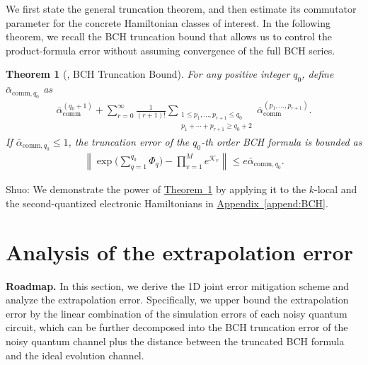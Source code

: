\documentclass[aps,pra,reprint,groupedaddress,floatfix]{revtex4-2}
\newtheorem{theorem}{Theorem}
\newcommand{\thm}[1]{\hyperref[thm:#1]{Theorem~\ref*{thm:#1}}}
\newcommand{\append}[1]{\hyperref[append:#1]{Appendix~\ref*{append:#1}}}
\renewcommand{\comm}{\mathrm{comm}}
\newcommand{\mc}{\mathcal}
\newcommand{\sz}[1]{{\color{blue} Shuo: #1}}
\begin{document}
We first state the general truncation theorem, and then estimate its commutator parameter for the concrete Hamiltonian classes of interest.
In the following theorem, we recall the BCH truncation bound that allows us to control the product-formula error without assuming convergence of the full BCH series.
\begin{theorem}[{\cite[Theorem~6]{wang2026lindbladiansimulationcommutatorbounds}}, BCH Truncation Bound]
 \label{thm:general-bch-truncation}
 For any positive integer $q_0$, define $\bar{\alpha}_{\comm,q_0}$ as
 \begin{align}
\label{eq:def-beta-comm-sum}
    \bar{\alpha}_{\comm}^{(q_0+1)}
    +
    \sum_{r = 0}^{\infty}\frac{1}{(r+1)!}
    \sum_{\substack{1\le p_1, \ldots, p_{r+1}\le q_0\\p_1+\cdots+p_{r+1} \ge q_0+2}}
    \bar{\alpha}_{\comm}^{(p_1, \ldots, p_{r+1})}.
\end{align}
 If $\bar{\alpha}_{\comm,q_0} \le 1$, the truncation error of the $q_0$-th order BCH formula is bounded as
 \begin{align*}
 \left\|\exp\Big(\sum_{q=1}^{q_0} \Phi_q\Big) - \prod_{v = 1}^Me^{\mc K_v} \right\| \le e\bar{\alpha}_{\comm,q_0}.
 \end{align*}
\end{theorem}

\sz{We demonstrate the power of \thm{general-bch-truncation} by applying it to the $k$-local and the second-quantized electronic Hamiltonians in \append{BCH}.}


\section{Analysis of the extrapolation error}
\noindent\textbf{Roadmap.} In this section, we derive the 1D joint error mitigation scheme and analyze the extrapolation error. Specifically, we upper bound the extrapolation error by the linear combination of the simulation errors of each noisy quantum circuit, which can be further decomposed into the BCH truncation error of the noisy quantum channel plus the distance between the truncated BCH formula and the ideal evolution channel.
\end{document}
